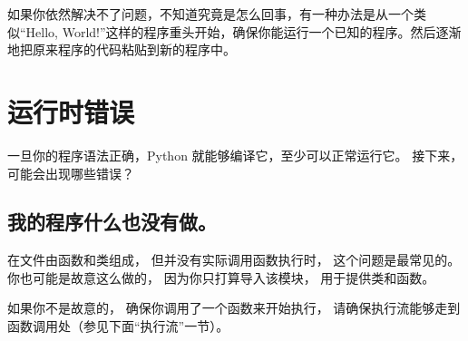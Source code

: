 
如果你依然解决不了问题，不知道究竟是怎么回事，有一种办法是从一个类似“Hello,
World!”这样的程序重头开始，确保你能运行一个已知的程序。然后逐渐地把原来程序的代码粘贴到新的程序中。

\section{运行时错误}


一旦你的程序语法正确，Python 就能够编译它，至少可以正常运行它。
接下来，可能会出现哪些错误？

\subsection{我的程序什么也没有做。}


在文件由函数和类组成， 但并没有实际调用函数执行时， 这个问题是最常见的。
你也可能是故意这么做的， 因为你只打算导入该模块， 用于提供类和函数。


如果你不是故意的， 确保你调用了一个函数来开始执行， 请确保执行流能够走到函数调用处（参见下面“执行流”一节）。


